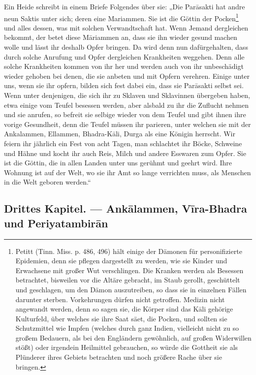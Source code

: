 \documentclass{article}
\begin{document}
Ein Heide schreibt in einem Briefe Folgendes über sie: „Die Par\={a}sakti hat andre neun Saktis unter sich; deren eine Mariammen. Sie ist die Göttin der Pocken\footnote{Petitt (Tinn. Miss. p. 486, 496) hält einige der Dämonen für personifizierte Epidemien, denn sie pflegen dargestellt zu werden, wie sie Kinder und Erwachsene mit großer Wut verschlingen. Die Kranken werden als Besessen betrachtet, bisweilen vor die Altäre gebracht, im Staub gerollt, geschüttelt und geschlagen, um den Dämon auszutreiben, so dass sie in einzelnen Fällen darunter sterben. Vorkehrungen dürfen nicht getroffen. Medizin nicht angewandt werden, denn so sagen sie, die Körper sind das K\={a}li gehörige Kulturfeld, über welches sie ihre Saat säet, die Pocken, und sollten sie Schutzmittel wie Impfen (welches durch ganz Indien, vielleicht nicht zu so großem Bedauern, als bei den Engländern gewöhnlich, auf großen Widerwillen stößt) oder irgendein Heilmittel gebrauchen, so würde die Gottheit sie als Plünderer ihres Gebiets betrachten und noch größere Rache über sie bringen.} und alles dessen, was mit solchen Verwandtschaft hat. Wenn Jemand dergleichen bekommt, der betet diese M\={a}riammen an, dass sie ihn wieder gesund machen wolle und lässt ihr deshalb Opfer bringen. Da wird denn nun dafürgehalten, dass durch solche Anrufung und Opfer dergleichen Krankheiten weggehen. Denn alle solche Krankheiten kommen von ihr her und werden auch von ihr unbeschädigt wieder gehoben bei denen, die sie anbeten und mit Opfern verehren. Einige unter uns, wenn sie ihr opfern, bilden sich fest dabei ein, dass sie Par\={a}sakti selbst sei. Wenn unter denjenigen, die sich ihr zu Sklaven und Sklavinnen übergeben haben, etwa einige vom Teufel besessen werden, aber alsbald zu ihr die Zuflucht nehmen und sie anrufen, so befreit sie selbige wieder von dem Teufel und gibt ihnen ihre vorige Gesundheit, denn die Teufel müssen ihr parieren, unter welchen sie mit der Ankalammen, Ellammen, Bhadra-K\={a}li, Durga als eine Königin herrscht. Wir feiern ihr jährlich ein Fest von acht Tagen, man schlachtet ihr Böcke, Schweine und Hähne und kocht ihr auch Reis, Milch und andere Esswaren zum Opfer. Sie ist die Göttin, die in allen Landen unter uns gerühmt und geehrt wird. Ihre Wohnung ist auf der Welt, wo sie ihr Amt so lange verrichten muss, als Menschen in die Welt geboren werden.“

\clearpage
\subsection{Drittes Kapitel. — Ank\={a}lammen, V\={i}ra-Bhadra und Periyatambir\={a}n}
\end{document}
